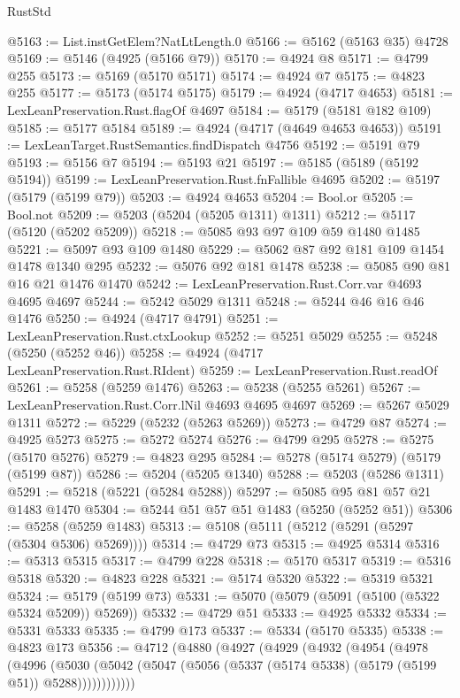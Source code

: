 \begin{lexlean}{RustStd}
\begin{coremodule}
{\begin{coremodule}
{{{{{{{{{{{{{{{{{{{{{{{{{{{{{{@5163 := List.instGetElem?NatLtLength.{0}
@5166 := @5162 (@5163 @35) @4728
@5169 := @5146 (@4925 (@5166 @79))
@5170 := @4924 @8
@5171 := @4799 @255
@5173 := @5169 (@5170 @5171)
@5174 := @4924 @7
@5175 := @4823 @255
@5177 := @5173 (@5174 @5175)
@5179 := @4924 (@4717 @4653)
@5181 := LexLeanPreservation.Rust.flagOf @4697
@5184 := @5179 (@5181 @182 @109)
@5185 := @5177 @5184
@5189 := @4924 (@4717 (@4649 @4653 @4653))
@5191 := LexLeanTarget.RustSemantics.findDispatch @4756
@5192 := @5191 @79
@5193 := @5156 @7
@5194 := @5193 @21
@5197 := @5185 (@5189 (@5192 @5194))
@5199 := LexLeanPreservation.Rust.fnFallible @4695
@5202 := @5197 (@5179 (@5199 @79))
@5203 := @4924 @4653
@5204 := Bool.or
@5205 := Bool.not
@5209 := @5203 (@5204 (@5205 @1311) @1311)
@5212 := @5117 (@5120 (@5202 @5209))
@5218 := @5085 @93 @97 @109 @59 @1480 @1485
@5221 := @5097 @93 @109 @1480
@5229 := @5062 @87 @92 @181 @109 @1454 @1478 @1340 @295
@5232 := @5076 @92 @181 @1478
@5238 := @5085 @90 @81 @16 @21 @1476 @1470
@5242 := LexLeanPreservation.Rust.Corr.var @4693 @4695 @4697
@5244 := @5242 @5029 @1311
@5248 := @5244 @46 @16 @46 @1476
@5250 := @4924 (@4717 @4791)
@5251 := LexLeanPreservation.Rust.ctxLookup
@5252 := @5251 @5029
@5255 := @5248 (@5250 (@5252 @46))
@5258 := @4924 (@4717 LexLeanPreservation.Rust.RIdent)
@5259 := LexLeanPreservation.Rust.readOf
@5261 := @5258 (@5259 @1476)
@5263 := @5238 (@5255 @5261)
@5267 := LexLeanPreservation.Rust.Corr.lNil @4693 @4695 @4697
@5269 := @5267 @5029 @1311
@5272 := @5229 (@5232 (@5263 @5269))
@5273 := @4729 @87
@5274 := @4925 @5273
@5275 := @5272 @5274
@5276 := @4799 @295
@5278 := @5275 (@5170 @5276)
@5279 := @4823 @295
@5284 := @5278 (@5174 @5279) (@5179 (@5199 @87))
@5286 := @5204 (@5205 @1340)
@5288 := @5203 (@5286 @1311)
@5291 := @5218 (@5221 (@5284 @5288))
@5297 := @5085 @95 @81 @57 @21 @1483 @1470
@5304 := @5244 @51 @57 @51 @1483 (@5250 (@5252 @51))
@5306 := @5258 (@5259 @1483)
@5313 := @5108 (@5111 (@5212 (@5291 (@5297 (@5304 @5306) @5269))))
@5314 := @4729 @73
@5315 := @4925 @5314
@5316 := @5313 @5315
@5317 := @4799 @228
@5318 := @5170 @5317
@5319 := @5316 @5318
@5320 := @4823 @228
@5321 := @5174 @5320
@5322 := @5319 @5321
@5324 := @5179 (@5199 @73)
@5331 := @5070 (@5079 (@5091 (@5100 (@5322 @5324 @5209)) @5269))
@5332 := @4729 @51
@5333 := @4925 @5332
@5334 := @5331 @5333
@5335 := @4799 @173
@5337 := @5334 (@5170 @5335)
@5338 := @4823 @173
@5356 := @4712
    (@4880
      (@4927
        (@4929
          (@4932
            (@4954
              (@4978
                (@4996
                  (@5030
                    (@5042 (@5047 (@5056 (@5337 (@5174 @5338) (@5179 (@5199 @51)) @5288))))))))))))
}}}}}}}}}}}}}}}}}}}}}}}}}}}}}}
\end{coremodule}}
\end{coremodule}
\end{lexlean}
